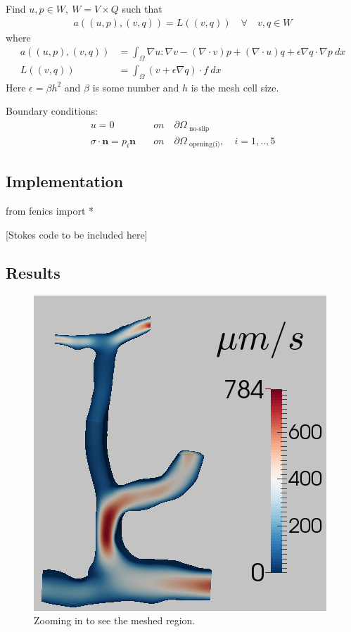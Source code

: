 \documentclass[epsfig,11pt]{article}
\begin{document}
Find $u,p \in W,\: W = V \times Q $ such that
\begin{align*}
a((u,p),(v,q)) = L((v,q)) \quad \forall \quad v,q \in W 
\end{align*}
where
\begin{align*}
a((u,p),(v,q)) &= \int_\Omega \nabla u : \nabla v - (\nabla \cdot v)p + (\nabla \cdot u)q + \epsilon \nabla q \cdot \nabla p \: dx \\
L((v,q)) &= \int_\Omega  (v + \epsilon \nabla q) \cdot f \: dx
\end{align*}
Here \(\epsilon = \beta h^2\) and \(\beta\) is some number and \(h\) is the mesh cell size.

Boundary conditions:
\begin{align*}
u = 0 \quad &on \quad \partial \Omega_{\text{ no-slip}} \\
\sigma \cdot \mathbf{n} = p_i\mathbf{n} \quad &on \quad \partial \Omega_\text{ opening(i)},\quad i=1,..,5
\end{align*}

\subsection{Implementation}

\begin{python}
from fenics import *

[Stokes code to be included here]
\end{python}


\subsection{Results}


\begin{figure}[h!] 
\begin{center}
  \includegraphics[scale=0.4]{result.png}
  \end{center}
  \caption{Zooming in to see the meshed region.}
\end{figure}
\end{document}
